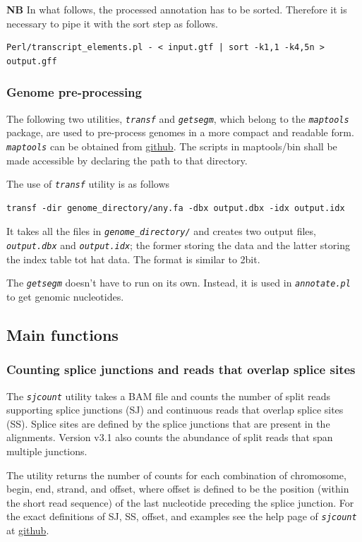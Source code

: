 \documentclass{article}
\newcommand{\prog}[1]{{\tt\em #1}}
\begin{document}
{\bf NB} In what follows, the processed annotation has to be sorted. Therefore it is necessary to pipe it with the sort step as follows.

\begin{verbatim} 
Perl/transcript_elements.pl - < input.gtf | sort -k1,1 -k4,5n > output.gff
\end{verbatim}

\subsubsection{Genome pre-processing}
The following two utilities, \prog{transf} and \prog{getsegm}, which belong to the \prog{maptools} package, are used to pre-process genomes in a more compact and
readable form. \prog{maptools} can be obtained from \href{https://github.com/pervouchine/maptools}{github}. The scripts in maptools/bin shall be made accessible
by declaring the path to that directory.

The use of \prog{transf} utility is as follows
\begin{verbatim} 
transf -dir genome_directory/any.fa -dbx output.dbx -idx output.idx
\end{verbatim}

It takes all the files in \prog{genome\_directory/} and creates two output files, \prog{output.dbx} and \prog{output.idx}; the former storing the data and the latter 
storing the index table tot hat data. The format is similar to 2bit. 

The \prog{getsegm} doesn't have to run on its own. Instead, it is used in \prog{annotate.pl} to get genomic nucleotides.


\subsection{Main functions}

\subsubsection{Counting splice junctions and reads that overlap splice sites}
The \prog{sjcount} utility takes a  BAM file and counts the number of split reads supporting splice junctions (SJ) and continuous reads 
that overlap splice sites (SS). Splice sites are defined by the splice junctions that are present in the alignments.
Version v3.1 also counts the abundance of split reads that span multiple junctions.

The utility returns the number of counts for each combination of chromosome, begin, end, strand, and offset, where offset is defined to 
be the position (within the short read sequence) of the last nucleotide preceding the splice junction. For the exact definitions of SJ, SS, 
offset, and examples see the help page of \prog{sjcount} at \href{https://github.com/pervouchine/sjcount}{github}. 
\end{document}

